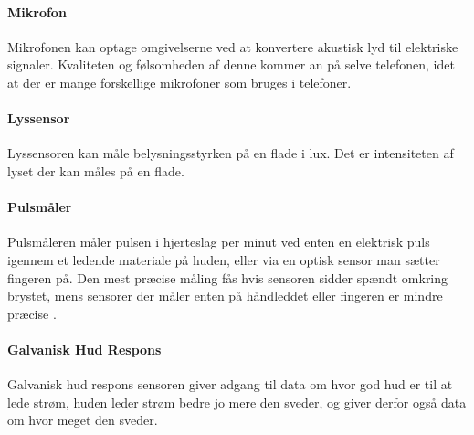\paragraph{Mikrofon}
Mikrofonen kan optage omgivelserne ved at konvertere akustisk lyd til elektriske signaler. Kvaliteten og følsomheden af denne kommer an på selve telefonen, idet at der er mange forskellige mikrofoner som bruges i telefoner. 

\paragraph{Lyssensor}
Lyssensoren kan måle belysningsstyrken på en flade i lux. Det er intensiteten af lyset der kan måles på en flade.

\paragraph{Pulsmåler}
Pulsmåleren måler pulsen i hjerteslag per minut ved enten en elektrisk puls igennem et ledende materiale på huden, eller via en optisk sensor man sætter fingeren på.
Den mest præcise måling fås hvis sensoren sidder spændt omkring brystet, mens sensorer der måler enten på håndleddet eller fingeren er mindre præcise \cite{burke1998precision}.

\paragraph{Galvanisk Hud Respons}
Galvanisk hud respons sensoren giver adgang til data om hvor god hud er til at lede strøm, huden leder strøm bedre jo mere den sveder, og giver derfor også data om hvor meget den sveder.